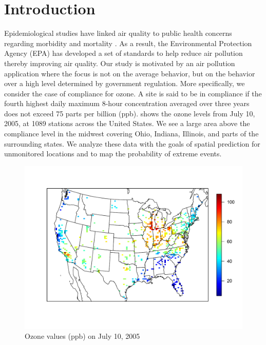 \documentclass[useAMS,usenatbib,referee]{biom}
\begin{document}
\section{Introduction}\label{sts:intro}
Epidemiological studies have linked air quality to public health concerns regarding morbidity and mortality \citep{Samet2000}.
As a result, the Environmental Protection Agency (EPA) has developed a set of standards to help reduce air pollution thereby improving air quality.
Our study is motivated by an air pollution application where the focus is not on the average behavior, but on the behavior over a high level determined by government regulation.
More specifically, we consider the case of compliance for ozone.
A site is said to be in compliance if the fourth highest daily maximum 8-hour concentration averaged over three years does not exceed 75 parts per billion (ppb).
 shows the ozone levels from July 10, 2005, at 1089 stations across the United States.
We see a large area above the compliance level in the midwest covering Ohio, Indiana, Illinois, and parts of the surrounding states.
We analyze these data with the goals of spatial prediction for unmonitored locations and to map the probability of extreme events.

\begin{figure}[h!tbp]
  \centering
  \includegraphics[width=0.75\linewidth]{plots/ozone-10jul-us.pdf}
  \caption{Ozone values (ppb) on July 10, 2005}
  \label{stfig:ozone-10jul}
\end{figure}
\end{document}

